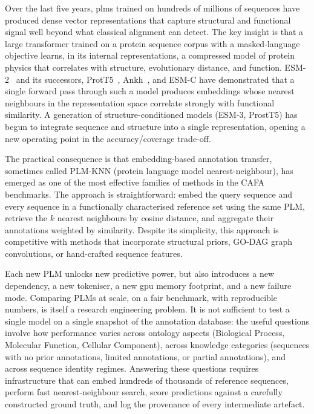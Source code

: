 Over the last five years, \glspl{plm} trained on hundreds of millions of sequences
have produced dense vector representations that capture structural and functional
signal well beyond what classical alignment can detect. The key insight is that a
large transformer trained on a protein sequence corpus with a masked-language
objective learns, in its internal representations, a compressed model of protein
physics that correlates with structure, evolutionary distance, and function.
ESM-2~\cite{lin2023esm2} and its successors, ProtT5~\cite{elnaggar2022prottrans}, Ankh~\cite{elnaggar2023ankh}, and
ESM-C have demonstrated that a single forward pass through such a model produces
embeddings whose nearest neighbours in the representation space correlate strongly
with functional similarity. A generation of structure-conditioned models (ESM-3,
ProstT5) has begun to integrate sequence and structure into a single representation,
opening a new operating point in the accuracy/coverage trade-off.

The practical consequence is that embedding-based annotation transfer, sometimes
called PLM-KNN (protein language model nearest-neighbour), has emerged as one of the
most effective families of methods in the CAFA benchmarks. The approach is
straightforward: embed the query sequence and every sequence in a functionally
characterised reference set using the same PLM, retrieve the $k$ nearest neighbours
by cosine distance, and aggregate their annotations weighted by similarity. Despite
its simplicity, this approach is competitive with methods that incorporate structural
priors, GO-DAG graph convolutions, or hand-crafted sequence features.

Each new PLM unlocks new predictive power, but also introduces a new dependency, a
new tokeniser, a new \gls{gpu} memory footprint, and a new failure mode. Comparing PLMs at
scale, on a fair benchmark, with reproducible numbers, is itself a research
engineering problem. It is not sufficient to test a single model on a single snapshot
of the annotation database: the useful questions involve how performance varies across
ontology aspects (Biological Process, Molecular Function, Cellular Component), across
knowledge categories (sequences with no prior annotations, limited annotations, or
partial annotations), and across sequence identity regimes. Answering these questions
requires infrastructure that can embed hundreds of thousands of reference sequences,
perform fast nearest-neighbour search, score predictions against a carefully
constructed ground truth, and log the provenance of every intermediate artefact.

